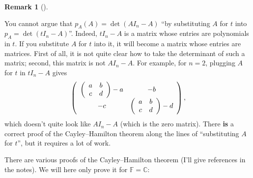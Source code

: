 \documentclass[numbers=enddot,12pt,final,onecolumn,notitlepage]{scrartcl}%
\numberwithin{exer}{subsection}
\theoremstyle{definition}
\newtheorem{remk}[theo]{Remark}
\newenvironment{remark}[1][]
{\begin{remk}[#1]\begin{leftbar}}
{\end{leftbar}\end{remk}}
\begin{document}
\begin{remark}
You cannot argue that $p_{A}\left(  A\right)  =\det\left(  AI_{n}-A\right)  $
\textquotedblleft by substituting $A$ for $t$ into $p_{A}=\det\left(
tI_{n}-A\right)  $\textquotedblright. Indeed, $tI_{n}-A$ is a matrix whose
entries are polynomials in $t$. If you substitute $A$ for $t$ into it, it will
become a matrix whose entries are matrices. First of all, it is not quite
clear how to take the determinant of such a matrix; second, this matrix is not
$AI_{n}-A$. For example, for $n=2$, plugging $A$ for $t$ in $tI_{n}-A$ gives%
\[
\left(
\begin{array}
[c]{cc}%
\left(
\begin{array}
[c]{cc}%
a & b\\
c & d
\end{array}
\right)  -a & -b\\
-c & \left(
\begin{array}
[c]{cc}%
a & b\\
c & d
\end{array}
\right)  -d
\end{array}
\right)  ,
\]
which doesn't quite look like $AI_{n}-A$ (which is the zero matrix). There
\textbf{is} a correct proof of the Cayley--Hamilton theorem along the lines of
\textquotedblleft substituting $A$ for $t$\textquotedblright, but it requires
a lot of work.
\end{remark}

There are various proofs of the Cayley--Hamilton theorem (I'll give references
in the notes). We will here only prove it for $\mathbb{F}=\mathbb{C}$:
\end{document}
